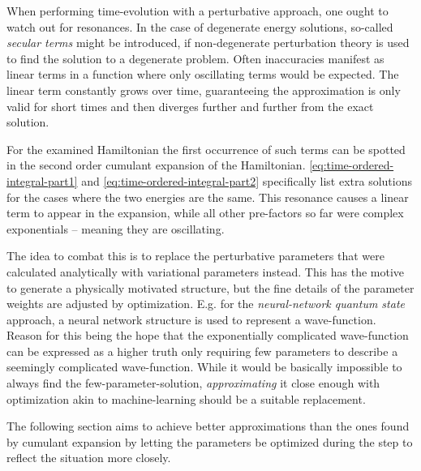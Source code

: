 When performing time-evolution with a perturbative approach, one ought to watch out for resonances.
In the case of degenerate energy solutions, so-called \emph{secular terms} \cite{secularTermsPerturbation} might be introduced, if non-degenerate perturbation theory is used to find the solution to a degenerate problem. 
Often inaccuracies manifest as linear terms in a function where only oscillating terms would be expected.
The linear term constantly grows over time, guaranteeing the approximation is only valid for short times and then diverges further and further from the exact solution.

For the examined Hamiltonian the first occurrence of such terms can be spotted in the second order cumulant expansion of the Hamiltonian.
\autoref{eq:time-ordered-integral-part1} and \autoref{eq:time-ordered-integral-part2} specifically list extra solutions for the cases where the two energies are the same.
This resonance causes a linear term to appear in the expansion, while all other pre-factors so far were complex exponentials -- meaning they are oscillating.

The idea to combat this is to replace the perturbative parameters that were calculated analytically with variational parameters instead.
This has the motive to generate a physically motivated structure, but the fine details of the parameter weights are adjusted by optimization.
E.g. for the \emph{neural-network quantum state} \cite{neuralNetworkQuantumStates} approach, a neural network structure is used to represent a wave-function.
Reason for this being the hope that the exponentially complicated wave-function can be expressed as a \glqq higher truth\grqq{} only requiring few parameters to describe a seemingly complicated wave-function.
While it would be basically impossible to always find the few-parameter-solution, \emph{approximating} it close enough with optimization akin to machine-learning should be a suitable replacement.

The following section aims to achieve better approximations than the ones found by cumulant expansion by letting the parameters be optimized during the step to reflect the situation more closely.